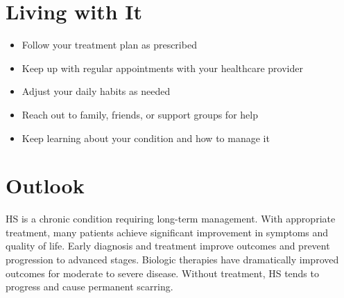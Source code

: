 \section{Living with It}

\begin{itemize}[noitemsep]
  \item Follow your treatment plan as prescribed
  \item Keep up with regular appointments with your healthcare provider
  \item Adjust your daily habits as needed
  \item Reach out to family, friends, or support groups for help
  \item Keep learning about your condition and how to manage it
\end{itemize}

\section{Outlook}
HS is a chronic condition requiring long-term management. With appropriate treatment, many patients achieve significant improvement in symptoms and quality of life. Early diagnosis and treatment improve outcomes and prevent progression to advanced stages. Biologic therapies have dramatically improved outcomes for moderate to severe disease. Without treatment, HS tends to progress and cause permanent scarring.
